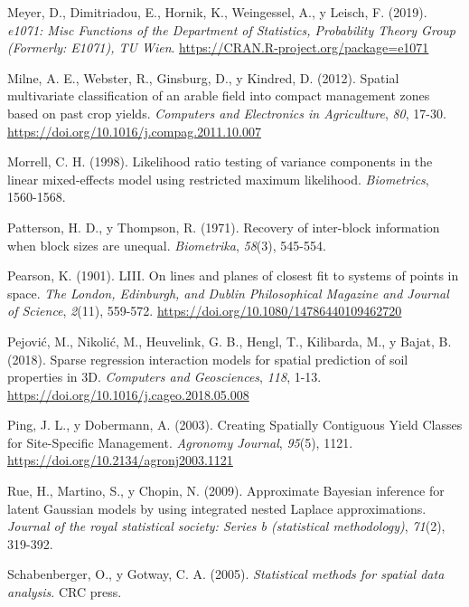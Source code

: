 \documentclass[11pt,b5paper,]{krantz}
\begin{document}
\hypertarget{ref-R-e1071}{}
Meyer, D., Dimitriadou, E., Hornik, K., Weingessel, A., y Leisch, F.
(2019). \emph{e1071: Misc Functions of the Department of Statistics,
Probability Theory Group (Formerly: E1071), TU Wien}.
\url{https://CRAN.R-project.org/package=e1071}

\hypertarget{ref-Milne_Webster_Ginsburg_Kindred_2012}{}
Milne, A. E., Webster, R., Ginsburg, D., y Kindred, D. (2012). Spatial
multivariate classification of an arable field into compact management
zones based on past crop yields. \emph{Computers and Electronics in
Agriculture}, \emph{80}, 17-30.
\url{https://doi.org/10.1016/j.compag.2011.10.007}

\hypertarget{ref-Morrell_1998}{}
Morrell, C. H. (1998). Likelihood ratio testing of variance components
in the linear mixed-effects model using restricted maximum likelihood.
\emph{Biometrics}, 1560-1568.

\hypertarget{ref-Patterson_Thompson_1971}{}
Patterson, H. D., y Thompson, R. (1971). Recovery of inter-block
information when block sizes are unequal. \emph{Biometrika},
\emph{58}(3), 545-554.

\hypertarget{ref-F.R.S._1901}{}
Pearson, K. (1901). LIII. On lines and planes of closest fit to systems
of points in space. \emph{The London, Edinburgh, and Dublin
Philosophical Magazine and Journal of Science}, \emph{2}(11), 559-572.
\url{https://doi.org/10.1080/14786440109462720}

\hypertarget{ref-Pejoviux107_Nikoliux107_Heuvelink_Hengl_Kilibarda_Bajat_2018}{}
Pejović, M., Nikolić, M., Heuvelink, G. B., Hengl, T., Kilibarda, M., y
Bajat, B. (2018). Sparse regression interaction models for spatial
prediction of soil properties in 3D. \emph{Computers and Geosciences},
\emph{118}, 1-13. \url{https://doi.org/10.1016/j.cageo.2018.05.008}

\hypertarget{ref-Ping_Dobermann_2003}{}
Ping, J. L., y Dobermann, A. (2003). Creating Spatially Contiguous Yield
Classes for Site-Specific Management. \emph{Agronomy Journal},
\emph{95}(5), 1121. \url{https://doi.org/10.2134/agronj2003.1121}

\hypertarget{ref-Rue_Martino_Chopin_2009}{}
Rue, H., Martino, S., y Chopin, N. (2009). Approximate Bayesian
inference for latent Gaussian models by using integrated nested Laplace
approximations. \emph{Journal of the royal statistical society: Series b
(statistical methodology)}, \emph{71}(2), 319-392.

\hypertarget{ref-Schabenberger_Gotway_2005}{}
Schabenberger, O., y Gotway, C. A. (2005). \emph{Statistical methods for
spatial data analysis}. CRC press.
\end{document}
